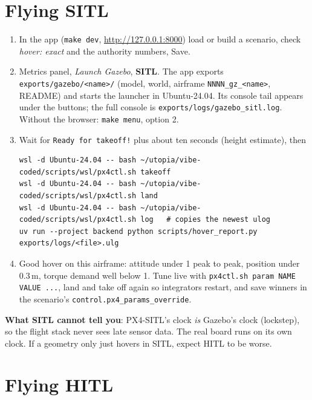 \documentclass[11pt,a4paper]{article}
\newcommand{\file}[1]{\texttt{#1}}
\newcommand{\param}[1]{\texttt{#1}}
\begin{document}
\section{Flying SITL}

\begin{enumerate}[leftmargin=*]
  \item In the app (\file{make dev}, \url{http://127.0.0.1:8000}) load or build a scenario, check
        \emph{hover: exact} and the authority numbers, Save.
  \item Metrics panel, \emph{Launch Gazebo}, \textbf{SITL}. The app exports
        \file{exports/gazebo/<name>/} (model, world, airframe \file{NNNN\_gz\_<name>}, README) and
        starts the launcher in Ubuntu-24.04. Its console tail appears under the buttons; the full
        console is \file{exports/logs/gazebo\_sitl.log}. Without the browser:
        \file{make menu}, option 2.
  \item Wait for \texttt{Ready for takeoff!} plus about ten seconds (height estimate), then
\begin{lstlisting}
wsl -d Ubuntu-24.04 -- bash ~/utopia/vibe-coded/scripts/wsl/px4ctl.sh takeoff
wsl -d Ubuntu-24.04 -- bash ~/utopia/vibe-coded/scripts/wsl/px4ctl.sh land
wsl -d Ubuntu-24.04 -- bash ~/utopia/vibe-coded/scripts/wsl/px4ctl.sh log   # copies the newest ulog
uv run --project backend python scripts/hover_report.py exports/logs/<file>.ulg
\end{lstlisting}
  \item Good hover on this airframe: attitude under 1\textdegree{} peak to peak, position under
        0.3\,m, torque demand well below 1. Tune live with \file{px4ctl.sh param NAME VALUE ...},
        land and take off again so integrators restart, and save winners in the scenario's
        \param{control.px4\_params\_override}.
\end{enumerate}

\textbf{What SITL cannot tell you}: PX4-SITL's clock \emph{is} Gazebo's clock (lockstep), so the
flight stack never sees late sensor data. The real board runs on its own clock. If a geometry
only just hovers in SITL, expect HITL to be worse.

\section{Flying HITL}
\end{document}
